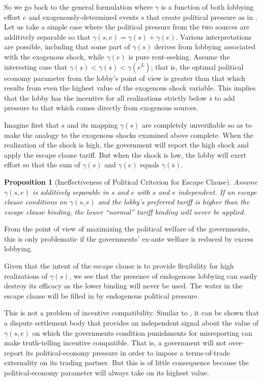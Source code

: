 \documentclass[12pt,titlepage]{article}
\newtheorem{proposition}{Proposition}
\newcommand{\ov}{\overline}
\newcommand{\un}{\underline}
\newcommand{\ga}{\gamma}
\begin{document}
So we go back to the general formulation where $\ga$ is a function of both lobbying effort $e$ and exogenously-determined events $s$ that create political pressure as in \Textcite{ms2011}. Let us take a simple case where the political pressure from the two sources are additively separable so that $\ga(s,e) = \ga(s) + \ga(e)$. Various interpretations are possible, including that some part of $\ga(s)$ derives from lobbying associated with the exogenous shock, while $\ga(e)$ is pure rent-seeking. Assume the interesting case that $\ga(\un{s}) < \ga(\ov{s}) < \ga(e^L)$; that is, the optimal political economy parameter from the lobby's point of view is greater than that which results from even the highest value of the exogenous shock variable. This implies that the lobby has the incentive for all realizations strictly below $\ov{s}$ to add pressure to that which comes directly from exogenous sources.

Imagine first that $s$ and its mapping $\ga(s)$ are completely unverifiable so as to make the analogy to the exogenous shocks examined above complete. When the realization of the shock is high, the government will report the high shock and apply the escape clause tariff. But when the shock is low, the lobby will exert effort so that the sum of $\ga(s)$ and $\ga(e)$ equals $\ga(\ov{s})$.

\begin{proposition}[Ineffectiveness of Political Criterion for Escape Clause]
    Assume $\ga(s,e)$ is additively separable in $s$ and $e$ with $s$ and $e$ independent. If an escape clause conditions on $\ga(s,e)$ and the lobby's preferred tariff is higher than the escape clause binding, the lower ``normal'' tariff binding will never be applied.
\end{proposition}

From the point of view of maximizing the political welfare of the governments, this is only problematic if the governments' ex-ante welfare is reduced by excess lobbying.

Given that the intent of the escape clause is to provide flexibility for high realizations of $\ga(s)$, we see that the presence of endogenous lobbying can easily destroy its efficacy as the lower binding will never be used. The water in the escape clause will be filled in by endogenous political pressure.

This is not a problem of incentive compatibility. Similar to \Textcite{beshkar2010b}, it can be shown that a dispute settlement body that provides an independent signal about the value of $\ga(s,e)$ on which the governments condition punishments for misreporting can make truth-telling incentive compatible. That is, a government will not over-report its political-economy pressure in order to impose a terms-of-trade externality on its trading partner. But this is of little consequence because the political-economy parameter will always take on its highest value.
\end{document}
